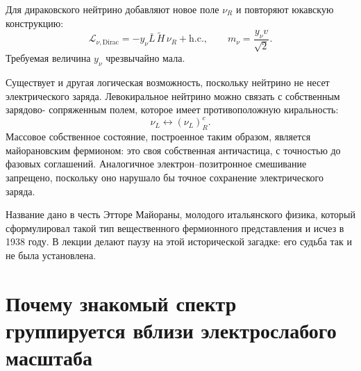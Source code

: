 Для дираковского нейтрино добавляют новое поле \(\nu_R\) и повторяют юкавскую
конструкцию:
\begin{equation}
  \mathcal L_{\nu,\mathrm{Dirac}}
  =-y_\nu\bar L\,\widetilde H\,\nu_R+\mathrm{h.c.},
  \qquad
  m_\nu=\frac{y_\nu v}{\sqrt2}.
  \label{eq:l09-dirac-neutrino}
\end{equation}
Требуемая величина \(y_\nu\) чрезвычайно мала.

Существует и другая логическая возможность, поскольку нейтрино не несет
электрического заряда. Левокиральное нейтрино можно связать с собственным зарядово-
сопряженным полем, которое имеет противоположную киральность:
\begin{equation}
  \nu_L\longleftrightarrow(\nu_L)^c_R .
  \label{eq:l09-majorana-mixing}
\end{equation}
Массовое собственное состояние, построенное таким образом, является майорановским фермионом:
это своя собственная античастица, с точностью до фазовых соглашений. Аналогичное электрон--позитронное
смешивание запрещено, поскольку оно нарушало бы точное сохранение
электрического заряда.

\begin{classroomqa}
\end{classroomqa}

Название дано в честь Этторе Майораны, молодого итальянского физика, который сформулировал
такой тип вещественного фермионного представления и исчез в 1938 году. В
лекции делают паузу на этой исторической загадке: его судьба так и не была установлена.

\section{Почему знакомый спектр группируется вблизи электрослабого масштаба}


